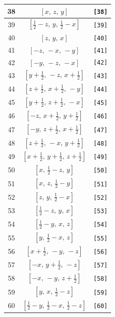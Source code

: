 \documentclass[fleqn,8pt]{jsarticle}
\begin{document}
\begin{longtable}{ccc}
38 & $\left[ x,\, z,\, y \right]$ & {\tt [38]} \\ \hline
39 & $\left[ \frac{1}{2} - z,\, y,\, \frac{1}{2} - x \right]$ & {\tt [39]} \\ \hline
40 & $\left[ z,\, y,\, x \right]$ & {\tt [40]} \\ \hline
41 & $\left[ - z,\, - x,\, - y \right]$ & {\tt [41]} \\ \hline
42 & $\left[ - y,\, - z,\, - x \right]$ & {\tt [42]} \\ \hline
43 & $\left[ y + \frac{1}{2},\, - z,\, x + \frac{1}{2} \right]$ & {\tt [43]} \\ \hline
44 & $\left[ z + \frac{1}{2},\, x + \frac{1}{2},\, - y \right]$ & {\tt [44]} \\ \hline
45 & $\left[ y + \frac{1}{2},\, z + \frac{1}{2},\, - x \right]$ & {\tt [45]} \\ \hline
46 & $\left[ - z,\, x + \frac{1}{2},\, y + \frac{1}{2} \right]$ & {\tt [46]} \\ \hline
47 & $\left[ - y,\, z + \frac{1}{2},\, x + \frac{1}{2} \right]$ & {\tt [47]} \\ \hline
48 & $\left[ z + \frac{1}{2},\, - x,\, y + \frac{1}{2} \right]$ & {\tt [48]} \\ \hline
49 & $\left[ x + \frac{1}{2},\, y + \frac{1}{2},\, z + \frac{1}{2} \right]$ & {\tt [49]} \\ \hline
50 & $\left[ x,\, \frac{1}{2} - z,\, y \right]$ & {\tt [50]} \\ \hline
51 & $\left[ x,\, z,\, \frac{1}{2} - y \right]$ & {\tt [51]} \\ \hline
52 & $\left[ z,\, y,\, \frac{1}{2} - x \right]$ & {\tt [52]} \\ \hline
53 & $\left[ \frac{1}{2} - z,\, y,\, x \right]$ & {\tt [53]} \\ \hline
54 & $\left[ \frac{1}{2} - y,\, x,\, z \right]$ & {\tt [54]} \\ \hline
55 & $\left[ y,\, \frac{1}{2} - x,\, z \right]$ & {\tt [55]} \\ \hline
56 & $\left[ x + \frac{1}{2},\, - y,\, - z \right]$ & {\tt [56]} \\ \hline
57 & $\left[ - x,\, y + \frac{1}{2},\, - z \right]$ & {\tt [57]} \\ \hline
58 & $\left[ - x,\, - y,\, z + \frac{1}{2} \right]$ & {\tt [58]} \\ \hline
59 & $\left[ y,\, x,\, \frac{1}{2} - z \right]$ & {\tt [59]} \\ \hline
60 & $\left[ \frac{1}{2} - y,\, \frac{1}{2} - x,\, \frac{1}{2} - z \right]$ & {\tt [60]} \\ \hline

\end{longtable}
\end{document}
